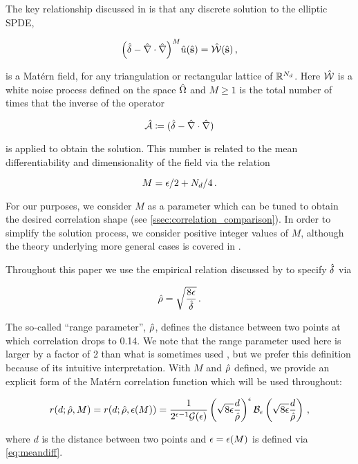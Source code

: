 The key relationship discussed in \citet{RSSB:RSSB777} is that any discrete solution to
the elliptic SPDE,
\begin{linenomath*}\begin{equation}
    \Big(\hat{\delta} - \hat{\nabla}\cdot\hat{\nabla}\Big)^{M}\hat{u}(\hat{\mathbf{s}}) =
    \hat{\mathcal{W}}(\hat{\mathbf{s}}) \, ,
    \label{eq:spde_iso}
\end{equation}\end{linenomath*}
is a Mat\'ern field, for any triangulation or rectangular lattice of $\mathbb{R}^{N_{d}}$.
Here
$\hat{\mathcal{W}}$ is a white noise process defined on the space $\hat{\Omega}$ and
$M\ge 1$ is the total number of times that the inverse of the operator
\begin{linenomath*}\begin{equation*}
\hat{\mathcal{A}} \coloneqq (\hat{\delta} - \hat{\nabla} \cdot \hat{\nabla})
\end{equation*}\end{linenomath*}
is applied to obtain the solution.
This number is related to the mean differentiability and
dimensionality of the field via the relation
\begin{linenomath*}\begin{equation}
    M = \epsilon/2 + N_{d}/4 \, .
    \label{eq:meandiff}
\end{equation}\end{linenomath*}
For our purposes, we consider $M$ as a parameter which can be tuned to obtain the
desired correlation shape (see \cref{ssec:correlation_comparison}).
In order to simplify the solution process, we consider positive integer values
of $M$, although the theory underlying more general cases is covered
in \citet{RSSB:RSSB777}.

Throughout this paper we use the empirical relation discussed by
\citet{RSSB:RSSB777} to specify $\hat{\delta}$ via
\begin{linenomath*}\begin{equation}
    \hat{\rho} = \sqrt{\dfrac{8\epsilon}{\hat{\delta}}} \, .
\end{equation}\end{linenomath*}
The so-called ``range parameter'', $\hat{\rho}$, defines the distance between two
points at which correlation drops to 0.14.
We note that the range parameter used here is larger by a factor of 2 than what
is sometimes used \citep[e.g.][]{rasmussen_gaussian_2006},
but we prefer this definition because of its intuitive interpretation.
With $M$ and $\hat{\rho}$ defined, we provide an explicit form of the Mat\'ern
correlation function which will be used throughout:
\begin{linenomath*}\begin{equation}
    r(d; \hat{\rho}, M) =
    r(d; \hat{\rho}, \epsilon(M)) =
    \dfrac{1}{2^{\epsilon-1}
    \mathcal{G}(\epsilon)}
    \left(\sqrt{8\epsilon} \dfrac{d}{\hat{\rho}}\right)^{\epsilon}
    \mathcal{B}_{\epsilon}
    \left(\sqrt{8\epsilon} \dfrac{d}{\hat{\rho}}\right) \, ,
\end{equation}\end{linenomath*}
where $d$ is the distance between two points and $\epsilon = \epsilon(M)$ is defined via
\cref{eq:meandiff}.

